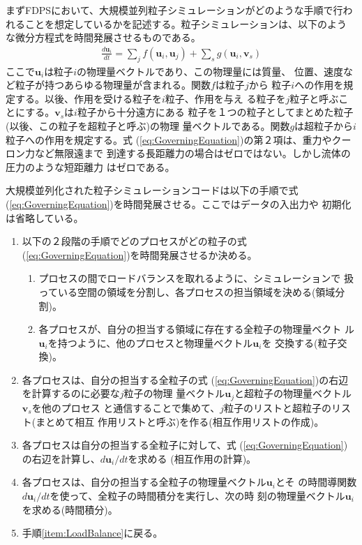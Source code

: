 まずFDPSにおいて、大規模並列粒子シミュレーションがどのような手順で行わ
れることを想定しているかを記述する。粒子シミュレーションは、以下のよう
な微分方程式を時間発展させるものである。
\begin{align}
    \frac{d\bm{u}_i}{dt} = \sum_j f(\bm{u}_i,\bm{u}_j) + \sum_s
    g(\bm{u}_i,\bm{v}_s) \label{eq:GoverningEquation}
\end{align}
ここで$\bm{u}_i$は粒子$i$の物理量ベクトルであり、この物理量には質量、
位置、速度など粒子が持つあらゆる物理量が含まれる。関数$f$は粒子$j$から
粒子$i$への作用を規定する。以後、作用を受ける粒子を$i$粒子、作用を与え
る粒子を$j$粒子と呼ぶことにする。$\bm{v}_s$は$i$粒子から十分遠方にある
粒子を１つの粒子としてまとめた粒子(以後、この粒子を超粒子と呼ぶ)の物理
量ベクトルである。関数$g$は超粒子から$i$粒子への作用を規定する。式
(\ref{eq:GoverningEquation})の第２項は、重力やクーロン力など無限遠まで
到達する長距離力の場合はゼロではない。しかし流体の圧力のような短距離力
はゼロである。

大規模並列化された粒子シミュレーションコードは以下の手順で式
(\ref{eq:GoverningEquation})を時間発展させる。ここではデータの入出力や
初期化は省略している。
\begin{enumerate}
\item 以下の２段階の手順でどのプロセスがどの粒子の式
  (\ref{eq:GoverningEquation})を時間発展させるか決める。
  \label{item:LoadBalance}
  \begin{enumerate}
  \item プロセスの間でロードバランスを取れるように、シミュレーションで
    扱っている空間の領域を分割し、各プロセスの担当領域を決める(領域分
    割)。
  \item 各プロセスが、自分の担当する領域に存在する全粒子の物理量ベクト
    ル$\bm{u}_i$を持つように、他のプロセスと物理量ベクトル$\bm{u}_i$を
    交換する(粒子交換)。
  \end{enumerate}

\item 各プロセスは、自分の担当する全粒子の式
  (\ref{eq:GoverningEquation})の右辺を計算するのに必要な$j$粒子の物理
  量ベクトル$\bm{u}_j$と超粒子の物理量ベクトル$\bm{v}_s$を他のプロセス
  と通信することで集めて、$j$粒子のリストと超粒子のリスト(まとめて相互
  作用リストと呼ぶ)を作る(相互作用リストの作成)。
  \label{item:MakeInteractionList}

\item 各プロセスは自分の担当する全粒子に対して、式
  (\ref{eq:GoverningEquation})の右辺を計算し、$d\bm{u}_i/dt$を求める
  (相互作用の計算)。\label{item:CalcInteraction}

\item 各プロセスは、自分の担当する全粒子の物理量ベクトル$\bm{u}_i$とそ
  の時間導関数$d\bm{u}_i/dt$を使って、全粒子の時間積分を実行し、次の時
  刻の物理量ベクトル$\bm{u}_i$を求める(時間積分)。
  \label{item:IntegrateTime}

\item 手順\ref{item:LoadBalance}に戻る。        
\end{enumerate}

